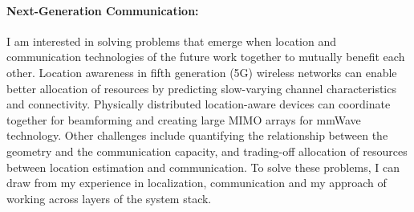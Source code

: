 \documentclass[11pt]{article}
\begin{document}
\paragraph{Next-Generation Communication: }
I am interested in solving problems that emerge when location and communication technologies of the future work together to mutually benefit each other. 
Location awareness in fifth generation (5G) wireless networks can enable better allocation of resources by predicting slow-varying channel characteristics and connectivity. Physically distributed location-aware devices can coordinate together for beamforming and creating large MIMO arrays for mmWave technology. %
Other challenges include quantifying the relationship between the geometry and the communication capacity, and trading-off allocation of resources between location estimation and communication. To solve these problems, I can draw from my experience in localization, communication and my approach of working across layers of the system stack. 





\end{document}
